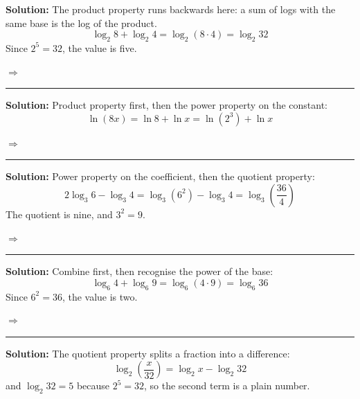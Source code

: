 \documentclass[12pt]{article}
\begin{document}




\textbf{Solution:} The product property runs backwards here: a sum of logs with the same base is the log of the product.
\[ \log_2 8 + \log_2 4 = \log_2(8 \cdot 4) = \log_2 32 \]
Since $2^5 = 32$, the value is five.

$\Rightarrow$ 

\vspace{0.15cm}\noindent\rule{\linewidth}{0.2pt}


\textbf{Solution:} Product property first, then the power property on the constant:
\[ \ln(8x) = \ln 8 + \ln x = \ln(2^3) + \ln x \]

$\Rightarrow$ 

\vspace{0.15cm}\noindent\rule{\linewidth}{0.2pt}


\textbf{Solution:} Power property on the coefficient, then the quotient property:
\[ 2\log_3 6 - \log_3 4 = \log_3(6^2) - \log_3 4 = \log_3\!\left(\frac{36}{4}\right) \]
The quotient is nine, and $3^2 = 9$.

$\Rightarrow$ 

\vspace{0.15cm}\noindent\rule{\linewidth}{0.2pt}


\textbf{Solution:} Combine first, then recognise the power of the base:
\[ \log_6 4 + \log_6 9 = \log_6(4 \cdot 9) = \log_6 36 \]
Since $6^2 = 36$, the value is two.

$\Rightarrow$ 

\vspace{0.15cm}\noindent\rule{\linewidth}{0.2pt}


\textbf{Solution:} The quotient property splits a fraction into a difference:
\[ \log_2\!\left(\frac{x}{32}\right) = \log_2 x - \log_2 32 \]
and $\log_2 32 = 5$ because $2^5 = 32$, so the second term is a plain number.
\end{document}
